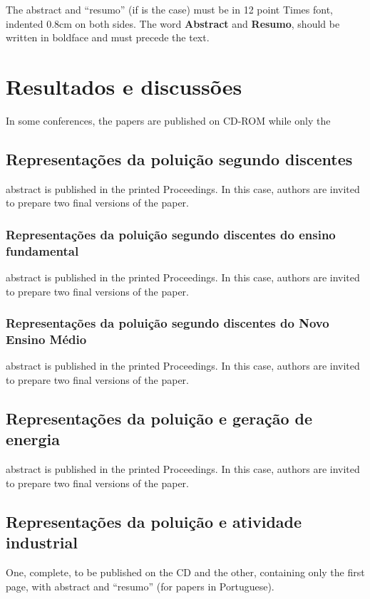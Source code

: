\documentclass[12pt]{article}
\begin{document}
The abstract and ``resumo'' (if is the case) must be in 12 point Times font,
indented 0.8cm on both sides. The word \textbf{Abstract} and \textbf{Resumo},
should be written in boldface and must precede the text.

\section{Resultados e discussões}

In some conferences, the papers are published on CD-ROM while only the

\subsection{Representações da poluição segundo discentes}
abstract is published in the printed Proceedings. In this case, authors are
invited to prepare two final versions of the paper.

\subsubsection{Representações da poluição segundo discentes do ensino fundamental}
abstract is published in the printed Proceedings. In this case, authors are
invited to prepare two final versions of the paper.

\subsubsection{Representações da poluição segundo discentes do Novo Ensino Médio}
abstract is published in the printed Proceedings. In this case, authors are
invited to prepare two final versions of the paper.

\subsection{Representações da poluição e geração de energia}
abstract is published in the printed Proceedings. In this case, authors are
invited to prepare two final versions of the paper.

\subsection{Representações da poluição e atividade industrial}
One, complete, to be
published on the CD and the other, containing only the first page, with
abstract and ``resumo'' (for papers in Portuguese).
\end{document}
